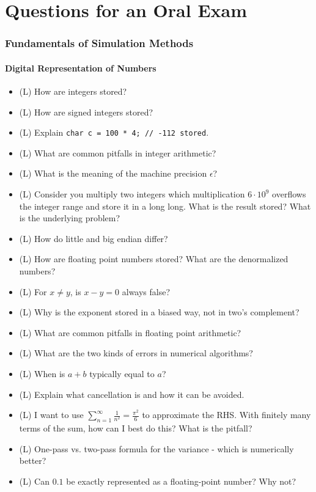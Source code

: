 \part{Questions for an Oral Exam}
\thispagestyle{plain}

\section{Fundamentals of Simulation Methods}

\subsection*{Digital Representation of Numbers}

\begin{itemize}
    \item (L) How are integers stored?
    \answerboxS
    \item (L) How are signed integers stored?
    \answerboxS
    \item (L) Explain \texttt{char c = 100 * 4; // -112 stored}.
    \answerboxS
    \item (L) What are common pitfalls in integer arithmetic?
    \answerboxM
    \item (L) What is the meaning of the machine precision $\epsilon$?
    \answerboxS
    \item (L) Consider you multiply two integers which multiplication
    $6\cdot 10^9$ overflows the integer range and store it in a long long.
    What is the result stored? What is the underlying problem?
    \answerboxS
    \item (L) How do little and big endian differ?
    \answerboxS
    \item (L) How are floating point numbers stored? What are the denormalized numbers?
    \answerboxL
    \item (L) For $x\neq y$, is $x-y = 0$ always false?
    \answerboxS
    \item (L) Why is the exponent stored in a biased way, not in two's complement?
    \answerboxS
    \item (L) What are common pitfalls in floating point arithmetic?
    \answerboxM
    \item (L) What are the two kinds of errors in numerical algorithms?
    \answerboxS
    \item (L) When is $a + b$ typically equal to $a$?
    \answerboxS
    \item (L) Explain what cancellation is and how it can be avoided.
    \answerboxM
    \item (L) I want to use $\sum_{n=1}^{\infty} \frac{1}{n^2} = \frac{\pi^2}{6}$ to approximate
    the RHS. With finitely many terms of the sum, how can I best do this? What is the pitfall?
    \answerboxS
    \item (L) One-pass vs. two-pass formula for the variance - which is numerically better?
    \answerboxS
    \item (L) Can $0.1$ be exactly represented as a floating-point number? Why not?
    \answerboxS
\end{itemize}


